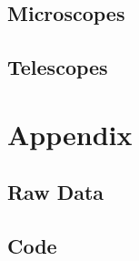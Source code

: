 \documentclass[12pt]{article}
\begin{document}
\subsection{Microscopes}

\subsection{Telescopes}

\newpage



 \label{sec:ref}

\newpage

\section*{Appendix} \label{sec:A}

\listoffigures

\listoftables

\subsection*{Raw Data}



\subsection*{Code}
\end{document}
